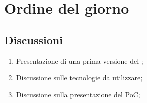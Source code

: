 \section{Ordine del giorno} \label{sec:agenda}
\subsection{Discussioni} \label{subsec:discussione}
\begin{enumerate}
    \item Presentazione di una prima versione del ;
    \item Discussione sulle tecnologie da utilizzare;
    \item Discussione sulla presentazione del PoC;
\end{enumerate}
